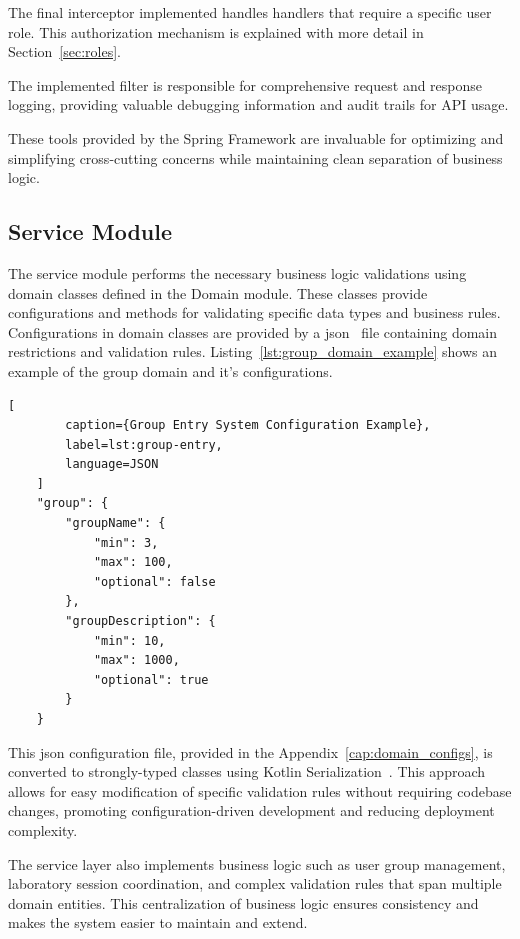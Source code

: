 The final interceptor implemented handles handlers that require a specific user role. This authorization mechanism is explained with more detail in Section~\ref{sec:roles}.

The implemented filter is responsible for comprehensive request and response logging, providing valuable debugging information and audit trails for API usage.

These tools provided by the Spring Framework are invaluable for optimizing and simplifying cross-cutting concerns while maintaining clean separation of business logic.

\subsection{Service Module}
\label{sec:service_module}
The service module performs the necessary business logic validations using domain classes defined in the Domain module. These classes provide configurations and methods for validating specific data types and business rules. Configurations in domain classes are provided by a \ac{json}~\cite{json} file containing domain restrictions and validation rules. Listing~\ref{lst:group_domain_example} shows an example of the group domain and it's configurations.

\begin{center}
    \begin{lstlisting}[
        caption={Group Entry System Configuration Example},
        label=lst:group-entry,
        language=JSON
    ]
    "group": {
        "groupName": {
            "min": 3,
            "max": 100,
            "optional": false
        },
        "groupDescription": {
            "min": 10,
            "max": 1000,
            "optional": true
        }
    }
    \end{lstlisting}\label{lst:group_domain_example}
    \end{center}

This \ac{json} configuration file, provided in the Appendix~\ref{cap:domain_configs}, is converted to strongly-typed classes using Kotlin Serialization~\cite{kotlin-serialization}. This approach allows for easy modification of specific validation rules without requiring codebase changes, promoting configuration-driven development and reducing deployment complexity.

The service layer also implements business logic such as user group management, laboratory session coordination, and complex validation rules that span multiple domain entities. This centralization of business logic ensures consistency and makes the system easier to maintain and extend.

